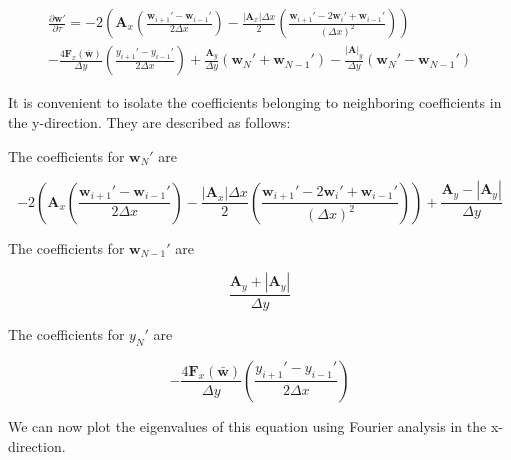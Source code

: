 \documentclass[10pt]{article}
\begin{document}
	\begin{multline}
		\frac{\partial \mathbf{w}'}{\partial \tau} = 
		- 2 \left( \mathbf{A}_x \left( \frac{\mathbf{w}_{i+1}' - \mathbf{w}_{i-1}'}{2 \Delta x}\right) - \frac{|\mathbf{A}_x| \Delta x}{2} \left( \frac{\mathbf{w}_{i+1}' - 2 \mathbf{w}_i' + \mathbf{w}_{i-1}'}{(\Delta x)^2} \right) \right)
		\\ - \frac{4 \mathbf{F}_{x}(\bar{\mathbf{w}})}{\Delta y}    \left( \frac{y_{i+1}' - y_{i-1}'}{2 \Delta x} \right)
		+ \frac{\mathbf{A}_y}{\Delta y} (\mathbf{w}_N' + \mathbf{w}_{N-1}')
		- \frac{|\mathbf{A}|_y}{\Delta y} (\mathbf{w}_N' - \mathbf{w}_{N-1}')
	\end{multline}
	
	 It is convenient to isolate the coefficients belonging to neighboring coefficients in the y-direction. They are described as follows:
	
	The coefficients for $\mathbf{w}_N'$ are
	
	$$ - 2 \left( \mathbf{A}_x \left( \frac{\mathbf{w}_{i+1}' - \mathbf{w}_{i-1}'}{2 \Delta x}\right) - \frac{|\mathbf{A}_x| \Delta x}{2} \left( \frac{\mathbf{w}_{i+1}' - 2 \mathbf{w}_i' + \mathbf{w}_{i-1}'}{(\Delta x)^2} \right) \right) + \frac{\mathbf{A}_y - |\mathbf{A}_y|}{\Delta y} $$
	
	The coefficients for $\mathbf{w}_{N-1}'$ are
	
	$$ \frac{\mathbf{A}_y + |\mathbf{A}_y|}{\Delta y} $$
	
	The coefficients for $y_N'$ are
	
	$$ -\frac{4 \mathbf{F}_{x}(\bar{\mathbf{w}})}{\Delta y}    \left( \frac{y_{i+1}' - y_{i-1}'}{2 \Delta x} \right) $$
	
	We can now plot the eigenvalues of this equation using Fourier analysis in the x-direction. 
	
\end{document}

